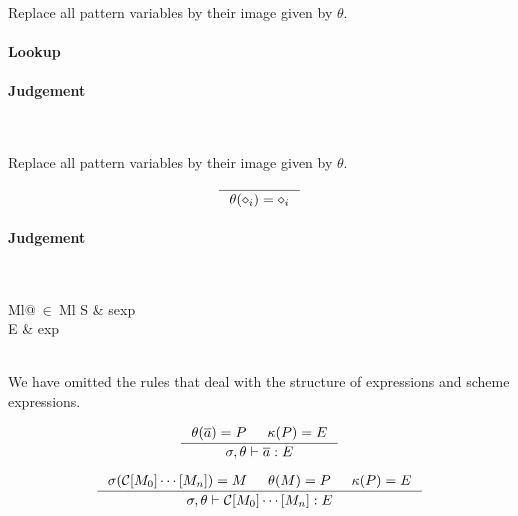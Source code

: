 Replace all pattern variables by their image given by $\theta$.


\paragraph{Lookup}

\paragraph{Judgement} \\


Replace all pattern variables by their image given by $\theta$.

\[
\inference
{
}
{
  \theta(\diamond_i) = \diamond_i
}
\]


\clearpage


\paragraph{Judgement} \\
\indent\begin{tabular}{Ml@{$\ \in\ $}Ml}
  S & sexp\\
  E & exp
\end{tabular}\\

We have omitted the rules that deal with the structure of expressions and scheme
expressions.

\[
\inference
{
  \theta(\overline{a}) = P & \kappa(P) = E
}
{
  \sigma, \theta |- \overline{a} : E
}
\]

\[
\inference
{
  \sigma(\mathcal{C}[M_0]\cdots[M_n]) = M & \theta(M) = P & \kappa(P) = E
}
{
  \sigma, \theta |- \mathcal{C}[M_0]\cdots[M_n] : E
}
\]


